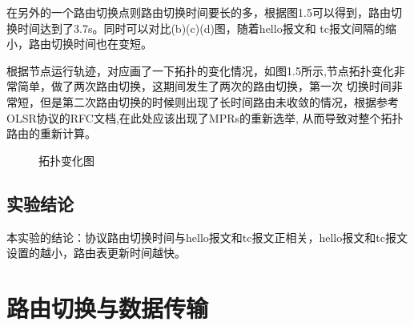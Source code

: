 \documentclass[a4paper,12pt]{report}
\begin{document}
\begin{spacing}{1.5}
在另外的一个路由切换点则路由切换时间要长的多，根据图1.5可以得到，路由切换时间达到了3.7s。同时可以对比(b)(c)(d)图，随着hello报文和
tc报文间隔的缩小，路由切换时间也在变短。


根据节点运行轨迹，对应画了一下拓扑的变化情况，如图1.5所示,节点拓扑变化非常简单，做了两次路由切换，这期间发生了两次的路由切换，第一次
切换时间非常短，但是第二次路由切换的时候则出现了长时间路由未收敛的情况，根据参考OLSR协议的RFC文档\cite{rfc3626.olsr},在此处应该出现了MPRs的重新选举,
从而导致对整个拓扑路由的重新计算。
\begin{figure}[hbtp]
\centering
{}
\caption{拓扑变化图}
\end{figure}


\section{实验结论}
本实验的结论：协议路由切换时间与hello报文和tc报文正相关，hello报文和tc报文设置的越小，路由表更新时间越快。

\end{spacing}

\chapter{路由切换与数据传输}
\end{document}
